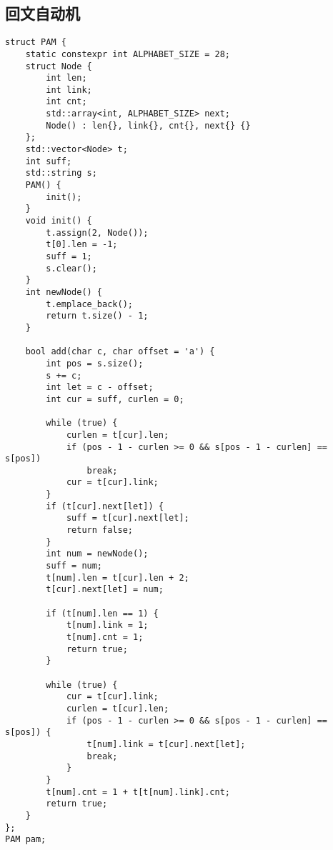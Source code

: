 \subsection{回文自动机}
\begin{lstlisting}
struct PAM {
    static constexpr int ALPHABET_SIZE = 28;
    struct Node {
        int len;
        int link;
        int cnt;
        std::array<int, ALPHABET_SIZE> next;
        Node() : len{}, link{}, cnt{}, next{} {}
    };
    std::vector<Node> t;
    int suff;
    std::string s;
    PAM() {
        init();
    }
    void init() {
        t.assign(2, Node());
        t[0].len = -1;
        suff = 1;
        s.clear();
    }
    int newNode() {
        t.emplace_back();
        return t.size() - 1;
    }
     
    bool add(char c, char offset = 'a') {
        int pos = s.size();
        s += c;
        int let = c - offset;
        int cur = suff, curlen = 0;
 
        while (true) {
            curlen = t[cur].len;
            if (pos - 1 - curlen >= 0 && s[pos - 1 - curlen] == s[pos])
                break;
            cur = t[cur].link;
        }
        if (t[cur].next[let]) {  
            suff = t[cur].next[let];
            return false;
        }
        int num = newNode();
        suff = num;
        t[num].len = t[cur].len + 2;
        t[cur].next[let] = num;
 
        if (t[num].len == 1) {
            t[num].link = 1;
            t[num].cnt = 1;
            return true;
        }
 
        while (true) {
            cur = t[cur].link;
            curlen = t[cur].len;
            if (pos - 1 - curlen >= 0 && s[pos - 1 - curlen] == s[pos]) {
                t[num].link = t[cur].next[let];
                break;
            }
        }
        t[num].cnt = 1 + t[t[num].link].cnt;
        return true;
    }
};
PAM pam;
\end{lstlisting}

